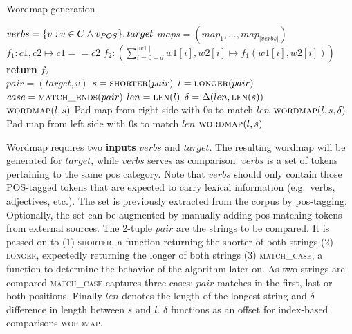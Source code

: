 \algrenewcommand{}
\algrenewcommand{}
\begin{algorithm}
    \caption{Wordmap generation}\label{alg:wordmap}
    \begin{algorithmic}[1]
        \Require $verbs = \{v : v \in C \wedge v_{\uppercase{POS}}\}, target$ 
        \Ensure $maps = (map_{1}, \ldots, map_{|verbs|})$
            \State $f_{1}: c1, c2 \mapsto c1 == c2$
            \State $f_{2}: \left(\sum_{i=0+d}^{\mid w1 \mid} w1[i], w2[i] \mapsto f_{1}(w1[i], w2[i])\right)$
            \State \textbf{return} $f_{2}$
        \EndFunction
        \\

        \State $pair = (target, v)$
        \State $s = \textsc{shorter}(pair)$
        \State $l = \textsc{longer}(pair)$
        \State $case = \textsc{match\_ends}(pair)$ 
        \State $len = \textsc{len}(l)$
        \State $\delta = \Delta(len, \textsc{len}(s))$
        \\


        
            \If{$\delta$}
                        \State $\textsc{wordmap}(l, s)$
                    \State Pad map from right side with 0s to match $len$
                \EndIf
                        \State $\textsc{wordmap}(l, s, \delta)$
                    \State Pad map from left side with 0s to match $len$
                \EndIf
            \Else
                \State $\textsc{wordmap}(l, s)$
            \EndIf
        \EndIf
        \EndFor

    \end{algorithmic}
\end{algorithm}


Wordmap requires two \textbf{inputs} $verbs$ and $target$.
The resulting wordmap will be generated for $target$, while $verbs$ serves as comparison.
$verbs$ is a set of tokens pertaining to the same \ac{pos} category.
Note that $verbs$ should only contain those POS-tagged tokens that are expected to carry lexical information (e.g.\ verbs, adjectives, etc.).
The set is previously extracted from the corpus by \ac{pos}\hyphen tagging.
Optionally, the set can be augmented by manually adding \ac{pos} matching tokens from external sources.
The 2-tuple $pair$ are the strings to be compared.
It is passed on to (1) \textsc{shorter}, a function returning the shorter of both strings (2) \textsc{longer}, expectedly returning the longer of both strings (3) \textsc{match\_case}, a function to determine the behavior of the algorithm later on.
As two strings are compared \textsc{match\_case} captures three cases: $pair$ matches in the first, last or both positions.
Finally $len$ denotes the length of the longest string and $\delta$ difference in length between $s$ and $l$.
$\delta$ functions as an offset for index-based comparisons \textsc{wordmap}.

